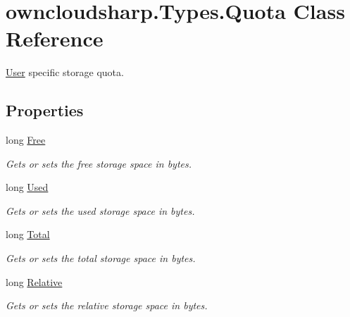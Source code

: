 \hypertarget{classowncloudsharp_1_1_types_1_1_quota}{}\section{owncloudsharp.\+Types.\+Quota Class Reference}
\label{classowncloudsharp_1_1_types_1_1_quota}


\hyperlink{classowncloudsharp_1_1_types_1_1_user}{User} specific storage quota.  


\subsection*{Properties}
\begin{DoxyCompactItemize}
\item 
long \hyperlink{classowncloudsharp_1_1_types_1_1_quota_ac91c3c7f5b5e8a4ca9250755bfd9a7e6}{Free}
\begin{DoxyCompactList}\small\item\em Gets or sets the free storage space in bytes. \end{DoxyCompactList}\item 
long \hyperlink{classowncloudsharp_1_1_types_1_1_quota_ad02ad456c3c3a6160c5d4eb18d81e515}{Used}
\begin{DoxyCompactList}\small\item\em Gets or sets the used storage space in bytes. \end{DoxyCompactList}\item 
long \hyperlink{classowncloudsharp_1_1_types_1_1_quota_af9707557b6c95b2ffaf874dc25c4609d}{Total}
\begin{DoxyCompactList}\small\item\em Gets or sets the total storage space in bytes. \end{DoxyCompactList}\item 
long \hyperlink{classowncloudsharp_1_1_types_1_1_quota_a6cfa2b67310f3eb74174594ab61a4bef}{Relative}
\begin{DoxyCompactList}\small\item\em Gets or sets the relative storage space in bytes. \end{DoxyCompactList}\end{DoxyCompactItemize}


